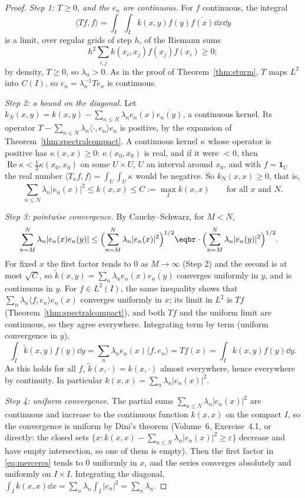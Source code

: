 \begin{proof}
\emph{Step 1: $T\ge0$, and the $e_n$ are continuous.} For $f$ continuous, the integral
\[\langle Tf,f\rangle=\int_I\!\int_Ik(x,y)f(y)\overline{f(x)}\dd x\dd y\]
is a limit, over regular grids of step $h$, of the Riemann sums
\[h^2\sum_{i,j}k(x_i,x_j)f(x_j)\overline{f(x_i)}\ge0;\] by density, $T\ge0$, so $\lambda_n>0$. As in the proof of Theorem~\ref{thm:sturm}, $T$ maps $L^2$ into $C(I)$, so $e_n=\lambda_n^{-1}Te_n$ is continuous.

\emph{Step 2: a bound on the diagonal.} Let $k_N(x,y)=k(x,y)-\sum_{n\le N}\lambda_ne_n(x)\overline{e_n(y)}$, a continuous kernel. Its operator $T-\sum_{n\le N}\lambda_n\langle\cdot,e_n\rangle e_n$ is positive, by the expansion of
Theorem~\ref{thm:spectralcompact}. A continuous kernel $\kappa$ whose operator is positive has $\kappa(x,x)\ge0$: $\kappa(x_0,x_0)$ is real, and if it were $<0$, then $\operatorname{Re}\kappa<\frac12\kappa(x_0,x_0)$ on some
$U\times U$, $U$ an interval around $x_0$, and with $f=\mathbf 1_U$ the real number $\langle T_\kappa f,f\rangle=\int_U\int_U\kappa$ would be negative. So $k_N(x,x)\ge0$, that is,
\[\sum_{n\le N}\lambda_n|e_n(x)|^2\le k(x,x)\le C:=\max_Ik(x,x)\qquad\text{for all }x\text{ and }N.\]

\emph{Step 3: pointwise convergence.} By Cauchy--Schwarz, for $M<N$,
\begin{equation}\label{eq:mercercs}
\begin{aligned}\sum_{n=M}^N\lambda_n|e_n(x)e_n(y)|&\le\Bigl(\sum_{n=M}^N\lambda_n|e_n(x)|^2\Bigr)^{1/2}\eqbr\cdot\Bigl(\sum_{n=M}^N\lambda_n|e_n(y)|^2\Bigr)^{1/2}.\end{aligned}
\end{equation}
For fixed $x$ the first factor tends to $0$ as $M\to\infty$ (Step 2) and the second is at most $\sqrt C$, so $\tilde k(x,y)=\sum_n\lambda_ne_n(x)\overline{e_n(y)}$ converges uniformly in $y$, and is continuous in $y$. For
$f\in L^2(I)$, the same inequality shows that $\sum_n\lambda_n\langle f,e_n\rangle e_n(x)$ converges uniformly in $x$; its limit in $L^2$ is $Tf$ (Theorem~\ref{thm:spectralcompact}), and both $Tf$ and the uniform limit
are continuous, so they agree everywhere. Integrating term by term (uniform convergence in $y$),
\[\int_I\tilde k(x,y)f(y)\dd y=\sum_n\lambda_ne_n(x)\langle f,e_n\rangle=Tf(x)=\int_Ik(x,y)f(y)\dd y.\]
As this holds for all $f$, $\tilde k(x,\cdot)=k(x,\cdot)$ almost everywhere, hence everywhere by continuity. In particular $k(x,x)=\sum_n\lambda_n|e_n(x)|^2$.

\emph{Step 4: uniform convergence.} The partial sums $\sum_{n\le N}\lambda_n|e_n(x)|^2$ are continuous and increase to the continuous function $k(x,x)$ on the compact $I$, so the convergence is uniform by Dini's theorem (Volume~6,
Exercise~4.1, or directly: the closed sets $\{x:k(x,x)-\sum_{n\le N}\lambda_n|e_n(x)|^2\ge\varepsilon\}$ decrease and have empty intersection, so one of them is empty). Then the first factor in \eqref{eq:mercercs} tends to
$0$ uniformly in $x$, and the series converges absolutely and uniformly on $I\times I$. Integrating the diagonal, $\int_Ik(x,x)\dd x=\sum_n\lambda_n\int_I|e_n|^2=\sum_n\lambda_n$.
\end{proof}

